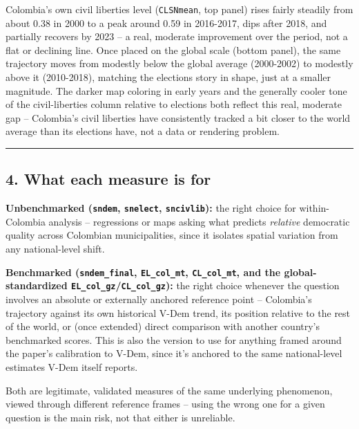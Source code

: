 \documentclass[
]{article}
\begin{document}
Colombia's own civil liberties level (\texttt{CLSNmean}, top panel)
rises fairly steadily from about 0.38 in 2000 to a peak around 0.59 in
2016-2017, dips after 2018, and partially recovers by 2023 -- a real,
moderate improvement over the period, not a flat or declining line. Once
placed on the global scale (bottom panel), the same trajectory moves
from modestly below the global average (2000-2002) to modestly above it
(2010-2018), matching the elections story in shape, just at a smaller
magnitude. The darker map coloring in early years and the generally
cooler tone of the civil-liberties column relative to elections both
reflect this real, moderate gap -- Colombia's civil liberties have
consistently tracked a bit closer to the world average than its
elections have, not a data or rendering problem.

\begin{center}\rule{0.5\linewidth}{0.5pt}\end{center}

\hypertarget{what-each-measure-is-for}{%
\subsection{4. What each measure is
for}\label{what-each-measure-is-for}}

\textbf{Unbenchmarked (\texttt{sndem}, \texttt{snelect},
\texttt{sncivlib}):} the right choice for within-Colombia analysis --
regressions or maps asking what predicts \emph{relative} democratic
quality across Colombian municipalities, since it isolates spatial
variation from any national-level shift.

\textbf{Benchmarked (\texttt{sndem\_final}, \texttt{EL\_col\_mt},
\texttt{CL\_col\_mt}, and the global-standardized
\texttt{EL\_col\_gz}/\texttt{CL\_col\_gz}):} the right choice whenever
the question involves an absolute or externally anchored reference point
-- Colombia's trajectory against its own historical V-Dem trend, its
position relative to the rest of the world, or (once extended) direct
comparison with another country's benchmarked scores. This is also the
version to use for anything framed around the paper's calibration to
V-Dem, since it's anchored to the same national-level estimates V-Dem
itself reports.

Both are legitimate, validated measures of the same underlying
phenomenon, viewed through different reference frames -- using the wrong
one for a given question is the main risk, not that either is
unreliable.
\end{document}
